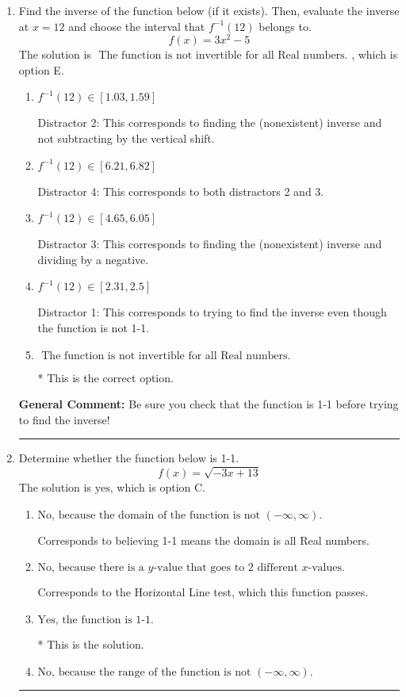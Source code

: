 \documentclass{extbook}[14pt]
\newcommand{\litem}[1]{\item #1

\rule{\textwidth}{0.4pt}}
\begin{document}
\begin{enumerate}\litem{
Find the inverse of the function below (if it exists). Then, evaluate the inverse at $x = 12$ and choose the interval that $f^{-1}(12)$ belongs to.
\[ f(x) = 3 x^2 - 5 \]The solution is \( \text{ The function is not invertible for all Real numbers. } \), which is option E.\begin{enumerate}[label=\Alph*.]
\item \( f^{-1}(12) \in [1.03, 1.59] \)

 Distractor 2: This corresponds to finding the (nonexistent) inverse and not subtracting by the vertical shift.
\item \( f^{-1}(12) \in [6.21, 6.82] \)

 Distractor 4: This corresponds to both distractors 2 and 3.
\item \( f^{-1}(12) \in [4.65, 6.05] \)

 Distractor 3: This corresponds to finding the (nonexistent) inverse and dividing by a negative.
\item \( f^{-1}(12) \in [2.31, 2.5] \)

 Distractor 1: This corresponds to trying to find the inverse even though the function is not 1-1. 
\item \( \text{ The function is not invertible for all Real numbers. } \)

* This is the correct option.
\end{enumerate}

\textbf{General Comment:} Be sure you check that the function is 1-1 before trying to find the inverse!
}
\litem{
Determine whether the function below is 1-1.
\[ f(x) = \sqrt{-3 x + 13} \]The solution is \( \text{yes} \), which is option C.\begin{enumerate}[label=\Alph*.]
\item \( \text{No, because the domain of the function is not $(-\infty, \infty)$.} \)

Corresponds to believing 1-1 means the domain is all Real numbers.
\item \( \text{No, because there is a $y$-value that goes to 2 different $x$-values.} \)

Corresponds to the Horizontal Line test, which this function passes.
\item \( \text{Yes, the function is 1-1.} \)

* This is the solution.
\item \( \text{No, because the range of the function is not $(-\infty, \infty)$.} \)


\end{enumerate}}
\end{enumerate}
\end{document}
